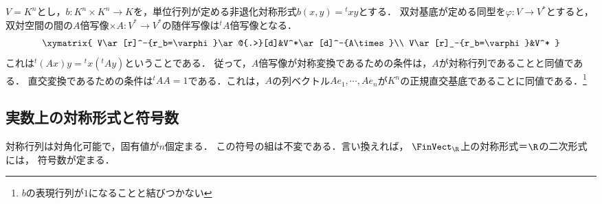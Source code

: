 \documentclass[uplatex, dvipdfmx]{jsreport}
\begin{document}
\begin{example}[標準内積]
    $V=K^n$とし，$b:K^n\times K^n\to K$を，単位行列が定める非退化対称形式$b(x,y)={}^t\!xy$とする．
    双対基底が定める同型を$\varphi:V\to V^*$とすると，双対空間の間の$A$倍写像$\times A:V^*\to V^*$の随伴写像は${}^t\!A$倍写像となる．
    \[\xymatrix{
        V\ar[r]^-{r_b=\varphi}\ar@{.>}[d]&V^*\ar[d]^-{A\times}\\
        V\ar[r]_-{r_b=\varphi}&V^*
    }\]
    これは${}^t\!(Ax)y={}^t\!x({}^t\!Ay)$ということである．
    従って，$A$倍写像が対称変換であるための条件は，$A$が対称行列であることと同値である．
    直交変換であるための条件は${}^t\!AA=1$である．これは，$A$の列ベクトル$Ae_1,\cdots,Ae_n$が$K^n$の正規直交基底であることに同値である．\footnote{$b$の表現行列が$1$になることと結びつかない}
\end{example}

\subsection{実数上の対称形式と符号数}

\begin{tcolorbox}[colframe=ForestGreen, colback=ForestGreen!10!white, breakable]
    対称行列は対角化可能で，固有値が$n$個定まる．
    この符号の組は不変である．言い換えれば，
    $\FinVect_\R$上の対称形式＝$\R$の二次形式には，
    符号数が定まる．
\end{tcolorbox}
\end{document}
